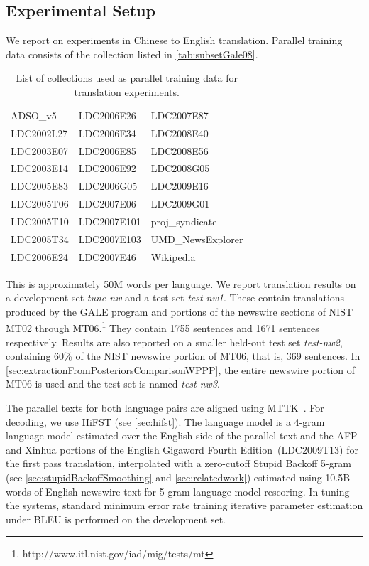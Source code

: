 \subsection{Experimental Setup}
\label{sec:extractionFromPosteriorsExperimentalSetup}

We report on experiments in Chinese to English translation.
Parallel training data
consists of the collection listed in \autoref{tab:subsetGale08}.
%
\begin{table}
\begin{center}
\end{center}
\begin{tabular}{|l|l|l|}
ADSO\_v5   & LDC2006E26 & LDC2007E87 \\
LDC2002L27 & LDC2006E34 & LDC2008E40 \\
LDC2003E07 & LDC2006E85 & LDC2008E56 \\
LDC2003E14 & LDC2006E92 & LDC2008G05 \\
LDC2005E83 & LDC2006G05 & LDC2009E16 \\
LDC2005T06 & LDC2007E06 & LDC2009G01 \\
LDC2005T10 & LDC2007E101 & proj\_syndicate \\
LDC2005T34 & LDC2007E103 & UMD\_NewsExplorer \\
LDC2006E24 & LDC2007E46 & Wikipedia \\
\end{tabular}
\caption{List of collections used as parallel training data for translation experiments.}
\label{tab:subsetGale08}
\end{table}
%
This is
approximately 50M words per language. We report translation results on a
development set \emph{tune-nw} and a test set \emph{test-nw1}. These contain
translations produced by the GALE program and portions of the newswire sections
of NIST MT02 through MT06.\footnote{http://www.itl.nist.gov/iad/mig/tests/mt}
They contain 1755 sentences and 1671 sentences respectively. Results are also
reported on a smaller held-out test set {\it test-nw2}, containing 60\% of the
NIST newswire portion of MT06, that is, 369 sentences.
In \autoref{sec:extractionFromPosteriorsComparisonWPPP}, the entire newswire
portion of MT06 is used and the test set is named \emph{test-nw3}.

The parallel texts for both language pairs are aligned using
MTTK~\citep{deng-byrne:2005:HLTEMNLP,deng-and-byrne:2008:ASLP}. For decoding,
we use HiFST (see \autoref{sec:hifst}). The language model
is a 4-gram language model estimated over the English side of the parallel text
and the AFP and Xinhua portions of the English Gigaword Fourth
Edition~(LDC2009T13) for the first pass translation, interpolated with a
zero-cutoff Stupid Backoff
5-gram (see \autoref{sec:stupidBackoffSmoothing} and
\autoref{sec:relatedwork}) estimated using 10.5B words of English newswire text for 5-gram language
model rescoring. In tuning the systems, standard minimum error rate training
iterative parameter estimation under BLEU is performed on the development set.


